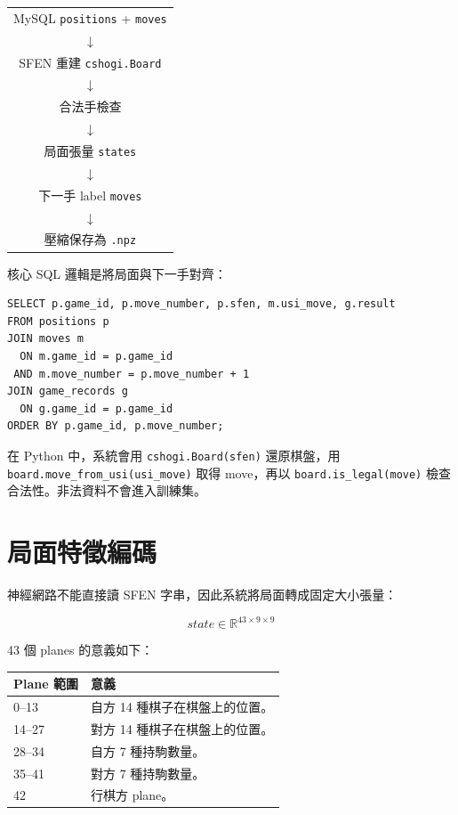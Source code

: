 \documentclass[12pt,a4paper,fontset=none]{ctexart}
\begin{document}
\begin{center}
\begin{tabular}{c}
MySQL \texttt{positions} + \texttt{moves} \\
$\downarrow$ \\
SFEN 重建 \texttt{cshogi.Board} \\
$\downarrow$ \\
合法手檢查 \\
$\downarrow$ \\
局面張量 \texttt{states} \\
$\downarrow$ \\
下一手 label \texttt{moves} \\
$\downarrow$ \\
壓縮保存為 \texttt{.npz}
\end{tabular}
\end{center}

核心 SQL 邏輯是將局面與下一手對齊：

\begin{lstlisting}[style=cmd]
SELECT p.game_id, p.move_number, p.sfen, m.usi_move, g.result
FROM positions p
JOIN moves m
  ON m.game_id = p.game_id
 AND m.move_number = p.move_number + 1
JOIN game_records g
  ON g.game_id = p.game_id
ORDER BY p.game_id, p.move_number;
\end{lstlisting}

在 Python 中，系統會用 \texttt{cshogi.Board(sfen)} 還原棋盤，用 \texttt{board.move\_from\_usi(usi\_move)} 取得 move，再以 \texttt{board.is\_legal(move)} 檢查合法性。非法資料不會進入訓練集。

\section{局面特徵編碼}

神經網路不能直接讀 SFEN 字串，因此系統將局面轉成固定大小張量：

\[
state \in \mathbb{R}^{43 \times 9 \times 9}
\]

43 個 planes 的意義如下：

\begin{longtable}{p{}p{}}
\toprule
\textbf{Plane 範圍} & \textbf{意義}\\
\midrule
\endhead
0--13 & 自方 14 種棋子在棋盤上的位置。\\
14--27 & 對方 14 種棋子在棋盤上的位置。\\
28--34 & 自方 7 種持駒數量。\\
35--41 & 對方 7 種持駒數量。\\
42 & 行棋方 plane。\\
\bottomrule
\end{longtable}
\end{document}
